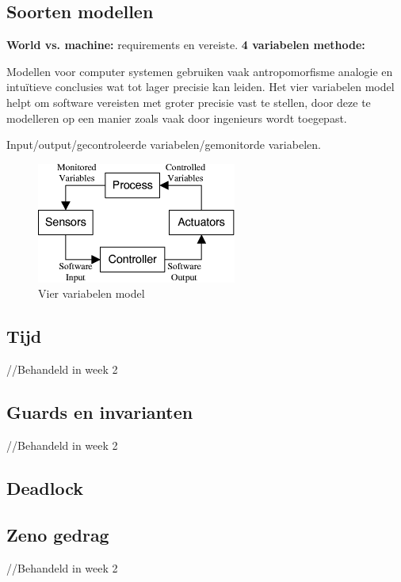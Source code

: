 \documentclass{article}
\begin{document}
\subsection{Soorten modellen}

\textbf{World vs. machine:}
requirements en vereiste.
\textbf{4 variabelen methode:}

Modellen voor computer systemen gebruiken vaak antropomorfisme analogie en intuïtieve conclusies wat tot lager precisie kan leiden. Het vier variabelen model helpt om software vereisten met groter precisie vast te stellen, door deze te modelleren op een manier zoals vaak door ingenieurs wordt toegepast. \cite{parnas1995functional} 

Input/output/gecontroleerde variabelen/gemonitorde variabelen.
\begin{figure}[!h]
	\centering
	\includegraphics[width=\textwidth]{four_Variables}
    \caption{Vier variabelen model \cite{thompson2000requirements}}
\end{figure}

\subsection{Tijd}
//Behandeld in week 2
\subsection{Guards en invarianten}
//Behandeld in week 2

\subsection{Deadlock}

\subsection{Zeno gedrag}
//Behandeld in week 2
\end{document}
